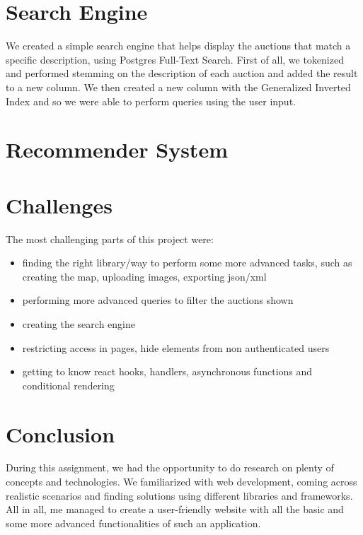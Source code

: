 \documentclass{article}
\begin{document}
\section{Search Engine}
We created a simple search engine that helps display the auctions that match a specific description, using Postgres Full-Text Search. First of all, we tokenized and performed stemming on the description of each auction and added the result to a new column. We then created a new column with the Generalized Inverted Index and so we were able to perform queries using the user input.
\section{Recommender System}

\section{Challenges}
The most challenging parts of this project were:
\begin{itemize}
\item finding the right library/way to perform some more advanced tasks, such as creating the map, uploading images, exporting json/xml
\item performing more advanced queries to filter the auctions shown
\item creating the search engine
\item restricting access in pages, hide elements from non authenticated users
\item getting to know react hooks, handlers, asynchronous functions and conditional rendering
\end{itemize}
\section{Conclusion}
During this assignment, we had the opportunity to do research on plenty of concepts and technologies. We familiarized with web development, coming across realistic scenarios and finding solutions using different libraries and frameworks. All in all, me managed to create a user-friendly website with all the basic and some more advanced functionalities of such an application.
\end{document}
